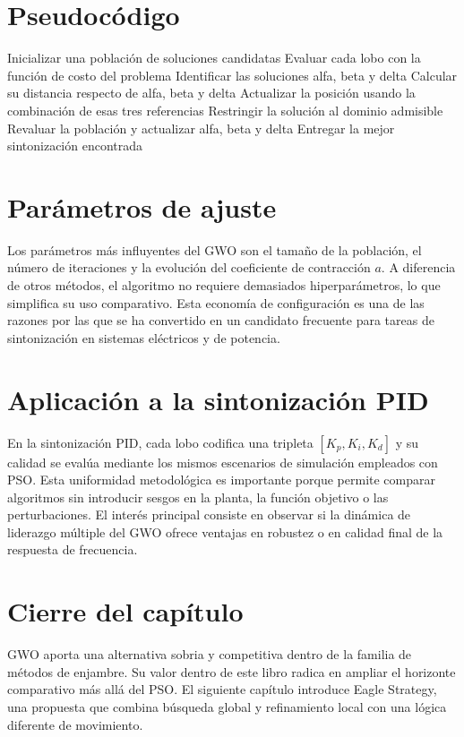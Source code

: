 \section{Pseudocódigo}
\begin{algorithm}[H]
\caption{Esquema general del GWO para sintonización PID}
\begin{algorithmic}[1]
\State Inicializar una población de soluciones candidatas
\State Evaluar cada lobo con la función de costo del problema
\State Identificar las soluciones alfa, beta y delta
        \State Calcular su distancia respecto de alfa, beta y delta
        \State Actualizar la posición usando la combinación de esas tres referencias
        \State Restringir la solución al dominio admisible
    \EndFor
    \State Revaluar la población y actualizar alfa, beta y delta
\EndWhile
\State Entregar la mejor sintonización encontrada
\end{algorithmic}
\end{algorithm}

\section{Parámetros de ajuste}
Los parámetros más influyentes del GWO son el tamaño de la población, el número de
iteraciones y la evolución del coeficiente de contracción $a$. A diferencia de otros métodos, el
algoritmo no requiere demasiados hiperparámetros, lo que simplifica su uso comparativo. Esta
economía de configuración es una de las razones por las que se ha convertido en un candidato
frecuente para tareas de sintonización en sistemas eléctricos y de potencia.

\section{Aplicación a la sintonización PID}
En la sintonización PID, cada lobo codifica una tripleta $\left[K_p,K_i,K_d\right]$ y su calidad se
evalúa mediante los mismos escenarios de simulación empleados con PSO. Esta uniformidad
metodológica es importante porque permite comparar algoritmos sin introducir sesgos en la
planta, la función objetivo o las perturbaciones. El interés principal consiste en observar si la
dinámica de liderazgo múltiple del GWO ofrece ventajas en robustez o en calidad final de la
respuesta de frecuencia.

\section{Cierre del capítulo}
GWO aporta una alternativa sobria y competitiva dentro de la familia de métodos de enjambre.
Su valor dentro de este libro radica en ampliar el horizonte comparativo más allá del PSO. El
siguiente capítulo introduce Eagle Strategy, una propuesta que combina búsqueda global y
refinamiento local con una lógica diferente de movimiento.
